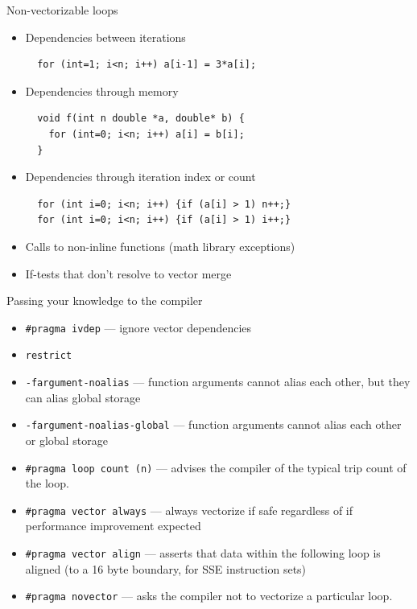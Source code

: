 \begin{frame}[fragile]{Non-vectorizable loops}
  \begin{itemize}
\item Dependencies between iterations
\begin{verbatim}
  for (int=1; i<n; i++) a[i-1] = 3*a[i];
\end{verbatim}
\item Dependencies through memory
\begin{verbatim}
  void f(int n double *a, double* b) {
    for (int=0; i<n; i++) a[i] = b[i];
  }
\end{verbatim}
\item Dependencies through iteration index or count
\begin{verbatim}
  for (int i=0; i<n; i++) {if (a[i] > 1) n++;}
  for (int i=0; i<n; i++) {if (a[i] > 1) i++;}
\end{verbatim}
\item Calls to non-inline functions (math library exceptions)
\item If-tests that don't resolve to vector merge  
  \end{itemize}
\end{frame}

\begin{frame}[fragile]{Passing your knowledge to the compiler}
  \begin{itemize}
  \item \verb+#pragma ivdep+ --- ignore vector dependencies
  \item \verb+restrict+
  \item \verb+-fargument-noalias+ ---  function arguments cannot alias each other, but they can alias global storage
  \item \verb+-fargument-noalias-global+ ---  function arguments cannot alias each other or global storage
  \item \verb+#pragma loop count (n)+ --- advises the compiler of the typical trip count of the loop.
  \item \verb+#pragma vector always+ --- always vectorize if safe regardless of if performance improvement expected
  \item \verb+#pragma vector align+ --- asserts that data within the following loop is aligned (to a 16 byte boundary, for SSE instruction sets)
  \item \verb+#pragma novector+ --- asks the compiler not to vectorize a particular loop.
  \end{itemize}
\end{frame}

